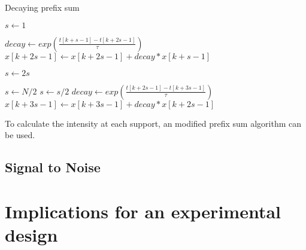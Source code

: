 \begin{algorithm}
	\caption{Decaying prefix sum}\label{prefix}
	\begin{algorithmic}
	 
		\State $s \gets 1$
		    
			
				\State $decay \gets exp\left(\frac{t[k+s-1]-t[k+2s-1]}{\tau}\right)$ 
				\State $x[k+2s-1] \gets x[k+2s-1] + decay*x[k+s-1]$
				
			\EndFor
			\State $s \gets 2s$ 
		\EndWhile
	\EndProcedure
	
		\State $s \gets N/2$
		    
			\State $s \gets s/2$
				\State $decay \gets exp\left(\frac{t[k+2s-1]-t[k+3s-1]}{\tau}\right)$ 
				\State $x[k+3s-1] \gets x[k+3s-1] + decay*x[k+2s-1]$
			\EndFor
		\EndWhile
	\EndProcedure
	
	\State	{}
	\State 	{}
	\EndProcedure
	
	\end{algorithmic}

\end{algorithm}



%	
%	
%

To calculate the intensity at each support, an modified prefix sum algorithm can be used.



\subsection{Signal to Noise}

\section{Implications for an experimental design}

